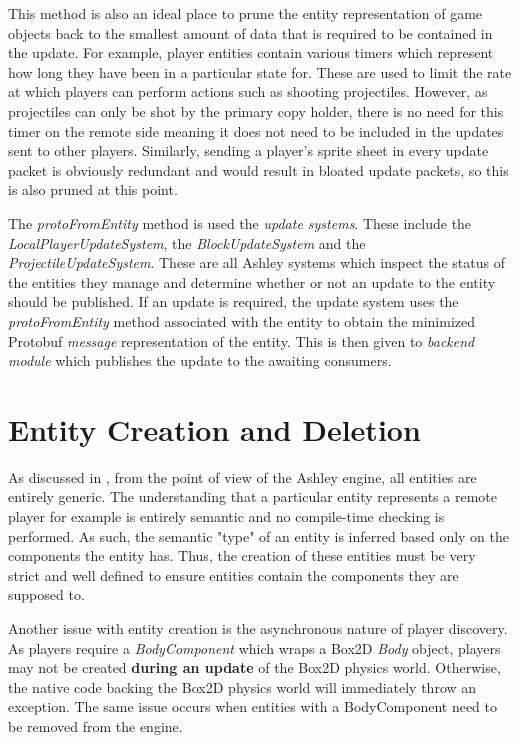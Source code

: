 This method is also an ideal place to prune the entity representation of game objects back to the smallest amount of data that is required to be contained in the update. For example, player entities contain various timers which represent how long they have been in a particular state for. These are used to limit the rate at which players can perform actions such as shooting projectiles. However, as projectiles can only be shot by the primary copy holder, there is no need for this timer on the remote side meaning it does not need to be included in the updates sent to other players. Similarly, sending a player's sprite sheet in every update packet is obviously redundant and would result in bloated update packets, so this is also pruned at this point.

The \textit{protoFromEntity} method is used the \textit{update systems}. These include the \textit{LocalPlayerUpdateSystem}, the \textit{BlockUpdateSystem} and the \textit{ProjectileUpdateSystem}. These are all Ashley systems which inspect the status of the entities they manage and determine whether or not an update to the entity should be published. If an update is required, the update system uses the \textit{protoFromEntity} method associated with the entity to obtain the minimized Protobuf \textit{message} representation of the entity. This is then given to \textit{backend module} which publishes the update to the awaiting consumers. 

\section{Entity Creation and Deletion}
As discussed in , from the point of view of the Ashley engine, all entities are entirely generic. The understanding that a particular entity represents a remote player for example is entirely semantic and no compile-time checking is performed. As such, the semantic "type" of an entity is inferred based only on the components the entity has. Thus, the creation of these entities must be very strict and well defined to ensure entities contain the components they are supposed to. 

Another issue with entity creation is the asynchronous nature of player discovery. As players require a \textit{BodyComponent} which wraps a Box2D \textit{Body} object, players may not be created \textbf{during an update} of the Box2D physics world. Otherwise, the native code backing the Box2D physics world will immediately throw an exception. The same issue occurs when entities with a BodyComponent need to be removed from the engine.  


